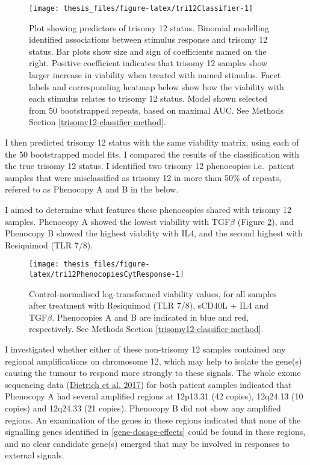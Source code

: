 \documentclass[11pt, a4paper, twosided]{book}
\begin{document}
\begin{figure}

{\centering \texttt{[image: thesis\_files/figure-latex/tri12Classifier-1]} 

}

\caption{Plot showing predictors of trisomy 12 status. Binomial modelling identified associations between stimulus response and trisomy 12 status. Bar plots show size and sign of coefficients named on the right. Positive coefficient indicates that trisomy 12 samples show larger increase in viability when treated with named stimulus. Facet labels and corresponding heatmap below show how the viability with each stimulus relates to trisomy 12 status. Model shown selected from 50 bootstrapped repeats, based on maximal AUC. See Methods Section \ref{trisomy12-classifier-method}.}\label{fig:tri12Classifier}
\end{figure}
I then predicted trisomy 12 status with the same viability matrix, using each of the 50 bootstrapped model fits. I compared the results of the classification with the true trisomy 12 status. I identified two trisomy 12 phenocopies i.e.~patient samples that were misclassified as trisomy 12 in more than 50\% of repeats, refered to as Phenocopy A and B in the below.

I aimed to determine what features these phenocopies shared with trisomy 12 samples. Phenocopy A showed the lowest viability with TGF\(\beta\) (Figure \ref{fig:tri12PhenocopiesCytResponse}), and Phenocopy B showed the highest viability with IL4, and the second highest with Resiquimod (TLR 7/8).


\begin{figure}

{\centering \texttt{[image: thesis\_files/figure-latex/tri12PhenocopiesCytResponse-1]} 

}

\caption{Control-normalised log-transformed viability values, for all samples after treatment with Resiquimod (TLR 7/8), sCD40L + IL4 and TGF\(\beta\). Phenocopies A and B are indicated in blue and red, respectively. See Methods Section \ref{trisomy12-classifier-method}.}\label{fig:tri12PhenocopiesCytResponse}
\end{figure}
I investigated whether either of these non-trisomy 12 samples contained any regional amplifications on chromosome 12, which may help to isolate the gene(s) causing the tumour to respond more strongly to these signals. The whole exome sequencing data (\protect\hyperlink{ref-JCIpaper}{Dietrich et al. 2017}) for both patient samples indicated that Phenocopy A had several amplified regions at 12p13.31 (42 copies), 12q24.13 (10 copies) and 12q24.33 (21 copies). Phenocopy B did not show any amplified regions. An examination of the genes in these regions indicated that none of the signalling genes identified in \ref{gene-dosage-effects} could be found in these regions, and no clear candidate gene(s) emerged that may be involved in responses to external signals.
\end{document}
